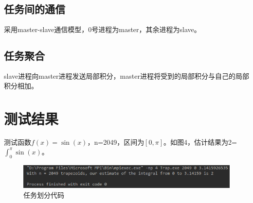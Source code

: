 \documentclass[12pt]{article}
\begin{document}
\subsection{任务间的通信}
采用master-slave通信模型，0号进程为master，其余进程为slave。
\subsection{任务聚合}
slave进程向master进程发送局部积分，master进程将受到的局部积分与自己的局部积分相加。
\section{测试结果}
测试函数$f(x)=\sin(x)$，n=2049，区间为$[0, \pi]$。如图4，估计结果为2=$\int_{0}^{\pi} \sin(x)$。
\begin{figure}[h]
\begin{center}
\includegraphics[width=\textwidth]{p5.png} %
\caption{任务划分代码}
\end{center}
\end{figure}
\end{document}
